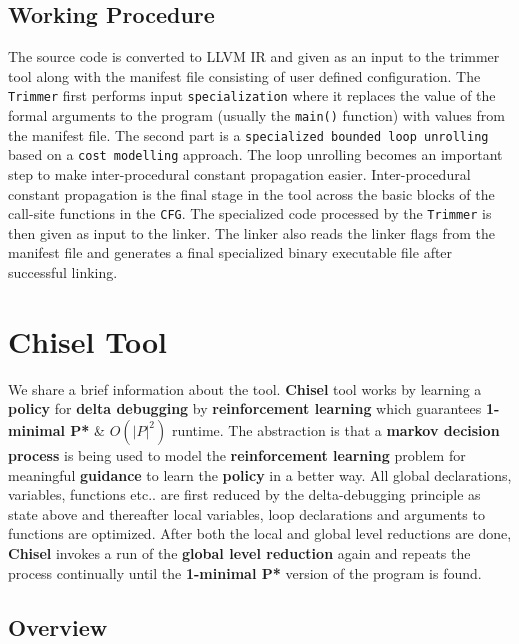\documentclass{relatorio}
\begin{document}
\subsection{Working Procedure}%
\label{Tools}

The source code is converted to LLVM IR  and given as an input to the trimmer tool along with the manifest file consisting of user defined configuration. The \texttt{Trimmer} first performs input \texttt{specialization} where it replaces the value of the formal arguments to the program (usually the \texttt{main()} function) with values from the manifest file. The second part is a \texttt{specialized bounded loop unrolling} based on a \texttt{cost modelling} approach. The loop unrolling becomes an important step to make inter-procedural constant propagation easier. Inter-procedural constant propagation is the final stage in the tool across the basic blocks of the call-site functions in the \texttt{CFG}. The specialized code processed by the \texttt{Trimmer} is then given as input to the linker. The linker also reads the linker flags from the manifest file and generates a final specialized binary executable file after successful linking.

\section{Chisel Tool}%
\label{Tools}

We share a brief information about the tool. \textbf{Chisel} tool works by learning a \textbf{policy} for \textbf{delta debugging} by \textbf{reinforcement learning} which guarantees \textbf{1-minimal P*} \& $\textbf{$O(|P|^2)$}$ runtime. The abstraction is that a \textbf{markov decision process} is being used to model the \textbf{reinforcement learning} problem for meaningful \textbf{guidance} to learn the \textbf{policy} in a better way. All global declarations, variables, functions etc.. are first reduced by the delta-debugging principle as state above and thereafter local variables, loop declarations and arguments to functions are optimized. After both the local and global level reductions are done, \textbf{Chisel} invokes a run of the \textbf{global level reduction} again and repeats the process continually until the \textbf{1-minimal P*} version of the program is found. 

\subsection{Overview}%
\label{Tools}
\end{document}
